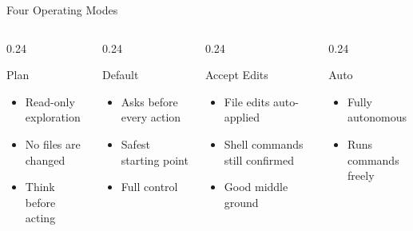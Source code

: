 \documentclass[aspectratio=169, 10pt]{beamer}
\begin{document}
\begin{frame}{Four Operating Modes}
  \begin{columns}[T]
    \begin{column}{0.24\textwidth}
      \begin{block}{Plan}
        \footnotesize
        \begin{itemize}[label=\textbullet]\setlength\itemsep{2pt}
          \item Read-only exploration
          \item No files are changed
          \item Think before acting
        \end{itemize}
      \end{block}
    \end{column}
    \begin{column}{0.24\textwidth}
      \begin{block}{Default}
        \footnotesize
        \begin{itemize}[label=\textbullet]\setlength\itemsep{2pt}
          \item Asks before every action
          \item Safest starting point
          \item Full control
        \end{itemize}
      \end{block}
    \end{column}
    \begin{column}{0.24\textwidth}
      \begin{block}{Accept Edits}
        \footnotesize
        \begin{itemize}[label=\textbullet]\setlength\itemsep{2pt}
          \item File edits auto-applied
          \item Shell commands still confirmed
          \item Good middle ground
        \end{itemize}
      \end{block}
    \end{column}
    \begin{column}{0.24\textwidth}
      \begin{block}{Auto}
        \footnotesize
        \begin{itemize}[label=\textbullet]\setlength\itemsep{2pt}
          \item Fully autonomous
          \item Runs commands freely

\end{itemize}
\end{block}
\end{column}
\end{columns}
\end{frame}
\end{document}
